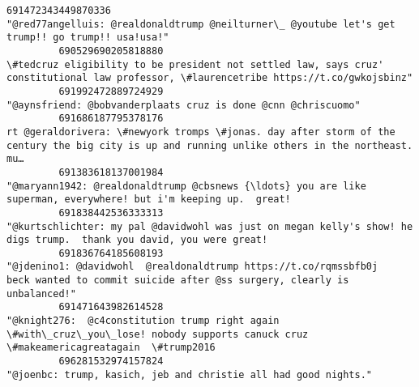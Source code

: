 \documentclass[11pt]{article}
\begin{document}
\begin{Verbatim}[commandchars=\\\{\}]
         691472343449870336                                                                                                                                                                                           "@red77angelluis: @realdonaldtrump @neilturner\_ @youtube let's get trump!! go trump!! usa!usa!"   
         690529690205818880                                                                                                                                                    \#tedcruz eligibility to be president not settled law, says cruz' constitutional law professor, \#laurencetribe https://t.co/gwkojsbinz"   
         691992472889724929                                                                                                                                                                                                                             "@aynsfriend: @bobvanderplaats cruz is done @cnn @chriscuomo"   
         691686187795378176                                                                                                                                              rt @geraldorivera: \#newyork tromps \#jonas. day after storm of the century the big city is up and running unlike others in the northeast. mu…   
         691383618137001984                                                                                                                                                                               "@maryann1942: @realdonaldtrump @cbsnews {\ldots} you are like superman, everywhere! but i'm keeping up.  great!   
         691838442536333313                                                                                                                                                                      "@kurtschlichter: my pal @davidwohl was just on megan kelly's show! he digs trump.  thank you david, you were great!   
         691836764185608193                                                                                                                                               "@jdenino1: @davidwohl  @realdonaldtrump https://t.co/rqmssbfb0j   beck wanted to commit suicide after @ss surgery, clearly is unbalanced!"   
         691471643982614528                                                                                                                                                       "@knight276:  @c4constitution trump right again \#with\_cruz\_you\_lose! nobody supports canuck cruz \#makeamericagreatagain  \#trump2016   
         696281532974157824                                                                                                                                                                                                                           "@joenbc: trump, kasich, jeb and christie all had good nights."   

\end{Verbatim}
\end{document}
